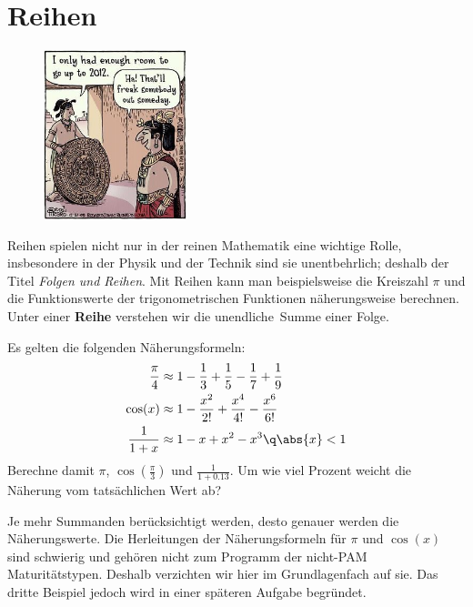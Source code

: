 \documentclass[%
11pt,%
twoside,%
titlepage,%
german,%
headsepline%
]{scrartcl}
\begin{document}
\section{Reihen}
\begin{figure}
\vspace{-15pt}
  \begin{center}
    \includegraphics[width=0.37\textwidth]{pictures/2012}
  \end{center}
\vspace{-60pt}
\end{figure}
Reihen spielen nicht nur in der reinen Mathematik eine wichtige Rolle, insbesondere in  der Physik und der Technik sind sie unentbehrlich; deshalb der Titel \emph{Folgen und Reihen}. Mit Reihen kann man beispielsweise die Kreiszahl  $\pi$ und die Funktionswerte der trigonometrischen Funktionen n\"aherungsweise berechnen. Unter einer \textbf{Reihe} verstehen wir die \glqq unendliche\grqq\ Summe einer Folge.

\begin{ueb}[N\"aherungen]
Es gelten die folgenden N\"aherungsformeln:
\begin{align*}
\frac{\pi}{4}&\approx1-\frac{1}{3}+\frac{1}{5}-\frac{1}{7}+\frac{1}{9}\\
\cos(x)&\approx1-\frac{x^2}{2!}+\frac{x^4}{4!}-\frac{x^6}{6!}\\
\frac{1}{1+x}&\approx1-x+x^2-x^3\q\abs{x}<1
\end{align*}
Berechne damit $\pi$, $\cos(\frac{\pi}{3})$ und $\frac{1}{1+0.13}$. Um wie viel Prozent weicht die N\"aherung vom tats\"achlichen Wert ab?
\end{ueb}

Je mehr Summanden ber\"ucksichtigt werden, desto genauer werden die N\"aherungswerte. Die Herleitungen der N\"aherungsformeln f\"ur $\pi$ und $\cos(x)$ sind schwierig und geh\"oren nicht zum Programm der nicht-PAM Maturit\"atstypen. Deshalb verzichten wir hier im Grundlagenfach auf sie. Das dritte Beispiel jedoch wird in einer sp\"ateren Aufgabe begr\"undet.
\end{document}

